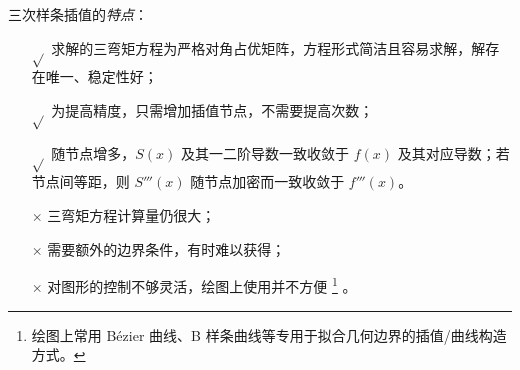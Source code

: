 \entry 三次样条插值的\emph{特点}：
\begin{itemize}
    \item [$\sqrt{}$] 求解的三弯矩方程为严格对角占优矩阵，方程形式简洁且容易求解，解存在唯一、稳定性好；
    \item [$\sqrt{}$] 为提高精度，只需增加插值节点，不需要提高次数；
    \item [$\sqrt{}$] 随节点增多，$S(x)$ 及其一二阶导数一致收敛于 $f(x)$ 及其对应导数；若节点间等距，则 $S'''(x)$ 随节点加密而一致收敛于 $f'''(x)$。
    \item [$\times$] 三弯矩方程计算量仍很大；
    \item [$\times$] 需要额外的边界条件，有时难以获得；
    \item [$\times$] 对图形的控制不够灵活，绘图上使用并不方便
    \footnote{绘图上常用 B\'ezier 曲线、B 样条曲线等专用于拟合几何边界的插值/曲线构造方式。}
    。
\end{itemize}